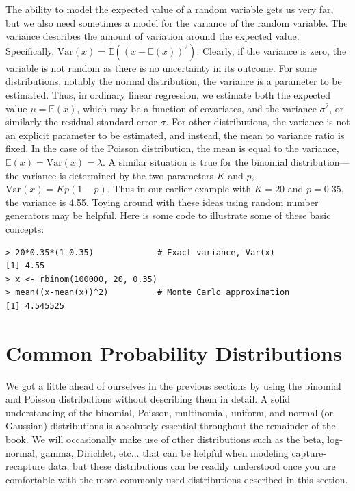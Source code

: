 The ability to model the expected value of a random variable gets us
very far, but we also need sometimes a model for the variance of the random
variable. The variance %
describes the amount of variation around the expected
value. Specifically, $\text{Var}(x) = \mathbb{E}((x -
\mathbb{E}(x))^2)$. Clearly, if the variance is zero, the variable is
not random as there is no uncertainty in its outcome.
For some distributions, notably the normal distribution, the variance
is a parameter to be estimated. Thus, in ordinary linear regression,
we estimate both the expected value $\mu=\mathbb{E}(x)$,
which may be a function of covariates, and the variance
$\sigma^2$, or similarly the residual standard error $\sigma$. For
other distributions, the variance is not an explicit parameter to be
estimated, and instead, the mean to variance ratio is fixed. In the
case of the Poisson distribution, the mean is equal to the
variance, $\mathbb{E}(x) = \text{Var}(x) = \lambda$.
A similar
situation is true for the binomial distribution---the variance is
determined by the two parameters $K$ and $p$, $\text{Var}(x) = Kp(1-p)$. Thus
in our earlier example with $K=20$ and $p=0.35$, the variance is
4.55. Toying around with these ideas using random number generators
may be helpful. Here is some code to illustrate some of these basic concepts:
\begin{verbatim}
> 20*0.35*(1-0.35)             # Exact variance, Var(x)
[1] 4.55
> x <- rbinom(100000, 20, 0.35)
> mean((x-mean(x))^2)          # Monte Carlo approximation
[1] 4.545525
\end{verbatim}



\section{Common Probability Distributions}
\label{sec.modeling.distributions}

We got a little ahead of ourselves in the previous sections by using
the binomial and Poisson distributions without describing them in detail.
A solid understanding of the binomial, Poisson, multinomial, uniform,
and normal (or Gaussian)
distributions is absolutely essential throughout the
remainder of the book. We will occasionally make use of other
distributions such as the %
beta, log-normal, %
gamma, Dirichlet, etc$\dots$ that can be helpful when
modeling capture-recapture data, but these distributions can be
readily understood once you are comfortable with the more commonly
used distributions described in this section.


